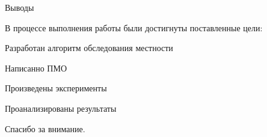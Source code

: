 \begin{tslide}{Выводы}

    В процессе выполнения работы были достигнуты поставленные цели:
    \begin{mintemize}
    \item Разработан алгоритм обследования местности
    \item Написанно ПМО
    \item Произведены эксперименты
    \item Проанализированы результаты
    \end{mintemize}

\end{tslide}

\begin{cslide}
    \LARGE Спасибо за внимание.
\end{cslide}


